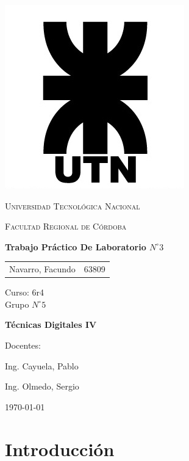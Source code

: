 \documentclass[11pt, a4paper]{article}
\begin{document}
\begin{titlepage}
 \centering
	\includegraphics[scale=0.80]{Imagenes/LOGO.jpg} \par
 	\vspace{1cm}
 	{\scshape\LARGE Universidad Tecnológica Nacional \par}
 	{\scshape\large Facultad Regional de Córdoba \par}
 	\vspace{1cm}
	{\bfseries \Large Trabajo Práctico De Laboratorio $N^{\circ} 3$\par}
 	\vspace{1.5cm}

	\begin{tabular}{ll}
		Navarro, Facundo		&	63809 	
	\end{tabular}
	
	\vspace{1cm}
	Curso: 6r4 \\
	Grupo $N^{\circ} 5$
 	\vfill
	{\bfseries \Large Técnicas Digitales IV\par}

	\vspace{1.5cm}
	Docentes: \par
	Ing. Cayuela, Pablo \par
	Ing. Olmedo, Sergio \par

 	\vfill
	{\large \today\par}
\end{titlepage}
	
	
\tableofcontents
\clearpage

\section{Introducción}
\end{document}
